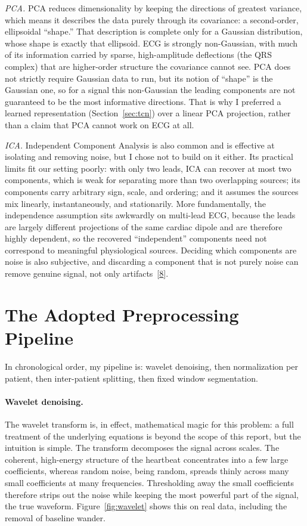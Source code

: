 \documentclass[11pt,a4paper]{article}
\newcommand{\rc}[1]{\hyperlink{ref#1}{#1}}
\begin{document}
\textit{PCA.} PCA reduces dimensionality by keeping the directions of greatest variance, which
means it describes the data purely through its covariance: a second-order, ellipsoidal
``shape.'' That description is complete only for a Gaussian distribution, whose shape is
exactly that ellipsoid. ECG is strongly non-Gaussian, with much of its information carried by
sparse, high-amplitude deflections (the QRS complex) that are higher-order structure the
covariance cannot see. PCA does not strictly require Gaussian data to run, but its notion of
``shape'' is the Gaussian one, so for a signal this non-Gaussian the leading components are not
guaranteed to be the most informative directions. That is why I preferred a learned
representation (Section~\ref{sec:tcn}) over a linear PCA projection, rather than a claim that
PCA cannot work on ECG at all.

\textit{ICA.} Independent Component Analysis is also common and is effective at isolating and
removing noise, but I chose not to build on it either. Its practical limits fit our setting
poorly: with only two leads, ICA can recover at most two components, which is weak for
separating more than two overlapping sources; its components carry arbitrary sign, scale, and
ordering; and it assumes the sources mix linearly, instantaneously, and stationarily. More
fundamentally, the independence assumption sits awkwardly on multi-lead ECG, because the leads
are largely different projections of the same cardiac dipole and are therefore highly
dependent, so the recovered ``independent'' components need not correspond to meaningful
physiological sources. Deciding which components are noise is also subjective, and discarding a
component that is not purely noise can remove genuine signal, not only
artifacts~[\rc{8}].

\section{The Adopted Preprocessing Pipeline}

In chronological order, my pipeline is: wavelet denoising, then normalization per patient,
then inter-patient splitting, then fixed window segmentation.

\paragraph{Wavelet denoising.} The wavelet transform is, in effect, mathematical magic for
this problem: a full treatment of the underlying equations is beyond the scope of this report,
but the intuition is simple. The transform decomposes the signal across scales. The coherent,
high-energy structure of the heartbeat concentrates into a few large coefficients, whereas
random noise, being random, spreads thinly across many small coefficients at many frequencies.
Thresholding away the small coefficients therefore strips out the noise while keeping the most
powerful part of the signal, the true waveform. Figure~\ref{fig:wavelet} shows this on real
data, including the removal of baseline wander.
\end{document}
